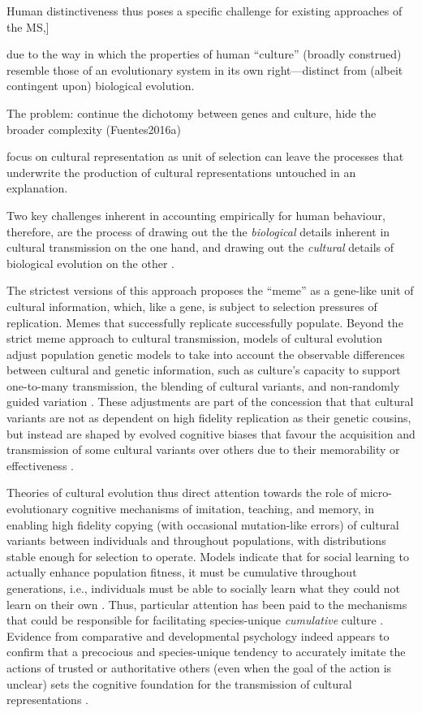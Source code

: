 Human distinctiveness thus poses a specific challenge for existing approaches of the MS,]

 due to the way in which the properties of human ``culture'' (broadly construed) resemble those of an evolutionary system in its own right---distinct from (albeit contingent upon) biological evolution.





The problem: continue the dichotomy between genes and culture, hide the broader complexity
(Fuentes2016a)

focus on cultural representation as unit of selection can leave the processes that underwrite the production of cultural representations untouched in an explanation.

Two key challenges inherent in accounting empirically for human behaviour, therefore, are the process of drawing out the the \textit{biological} details inherent in cultural transmission on the one hand, and drawing out the \textit{cultural} details of biological evolution on the other \citep{Claidiere2014,Fuentes2016a}.


  The strictest versions of this approach proposes the ``meme'' as a gene-like unit of cultural information, which, like a gene, is subject to selection pressures of replication.  Memes that successfully replicate successfully populate\citep{Dawkins1976}.  Beyond the strict meme approach to cultural transmission, models of cultural evolution adjust population genetic models to take into account the observable differences between cultural and genetic information, such as culture's capacity to support one-to-many transmission, the blending of cultural variants, and non-randomly guided variation \citep{Cavalli-Sforza1981,Boyd1988}.  These adjustments are part of the concession that that cultural variants are not as dependent on high fidelity replication as their genetic cousins, but instead are shaped by evolved cognitive biases that favour the acquisition and transmission of some cultural variants over others due to their memorability or effectiveness \citep{Henrich2007}.

Theories of cultural evolution thus direct attention towards the role of micro-evolutionary cognitive mechanisms of imitation, teaching, and memory, in enabling high fidelity copying (with occasional mutation-like errors) of cultural variants between individuals and throughout populations, with distributions stable enough for selection to operate.  Models indicate that for social learning to actually enhance population fitness, it must be cumulative throughout generations, i.e., individuals must be able to socially learn what they could not learn on their own \citep{Boyd1995}.  Thus, particular attention has been paid to the mechanisms that could be responsible for facilitating species-unique \textit{cumulative} culture \citep{Tomasello2008}.  Evidence from comparative and developmental psychology indeed appears to confirm that a precocious and species-unique tendency to accurately imitate the actions of trusted or authoritative others (even when the goal of the action is unclear) sets the cognitive foundation for the transmission of cultural representations \citep{Tomasello2014a}.

